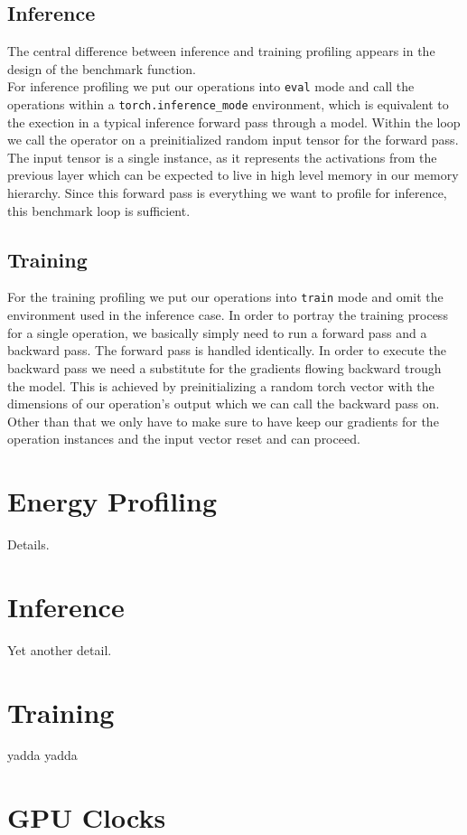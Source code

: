 \subsection{Inference}
The central difference between inference and training profiling appears in the design of the benchmark function. \\
For inference profiling we put our operations into \texttt{eval} mode and call the operations within a \texttt{torch.inference\_mode} environment, which is equivalent to the exection in a typical inference forward pass through a model. Within the loop we call the operator on a preinitialized random input tensor for the forward pass. The input tensor is a single instance, as it represents the activations from the previous layer which can be expected to live in high level memory in our memory hierarchy. Since this forward pass is everything we want to profile for inference, this benchmark loop is sufficient.

\subsection{Training}
    For the training profiling we put our operations into \texttt{train} mode and omit the environment used in the inference case. In order to portray the training process for a single operation, we basically simply need to run a forward pass and a backward pass. The forward pass is handled identically. In order to execute the backward pass we need a substitute for the gradients flowing backward trough the model. This is achieved by preinitializing a random torch vector with the dimensions of our operation's output which we can call the backward pass on. Other than that we only have to make sure to have keep our gradients for the operation instances and the input vector reset and can proceed.


\section{Energy Profiling}

Details.

\section{Inference}

Yet another detail.

\section{Training}

yadda yadda

\section{GPU Clocks}